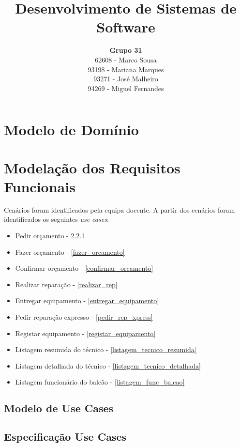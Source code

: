 \documentclass[a4paper, 12pt]{article}
\title {Desenvolvimento de Sistemas de Software}
\author{\textbf{Grupo 31} \\
        62608 - Marco Sousa \\
        93198 - Mariana Marques \\
        93271 - José Malheiro \\
        94269 - Miguel Fernandes}
\begin{document}
\maketitle

\section{Modelo de Domínio}

\section{Modelação dos Requisitos Funcionais}
Cenários foram identificados pela equipa docente.
A partir dos cenários foram identificados os seguintes \textit{use cases}:
\begin{itemize}
        \item Pedir orçamento - \ref{pedir_orcamento}
        \item Fazer orçamento - \ref{fazer_orcamento}
        \item Confirmar orçamento - \ref{confirmar_orcamento}
        \item Realizar reparação - \ref{realizar_rep}
        \item Entregar equipamento - \ref{entregar_equipamento}
        \item Pedir reparação expresso - \ref{pedir_rep_xpress}
        \item Registar equipamento - \ref{registar_equipamento}
        \item Listagem resumida do técnico - \ref{listagem_tecnico_resumida}
        \item Listagem detalhada do técnico - \ref{listagem_tecnico_detalhada}
        \item Listagem funcionário do balcão - \ref{listagem_func_balcao}
\end{itemize}
\subsection{Modelo de Use Cases}

\subsection{Especificação Use Cases}

\subsubsection{} \label{pedir_orcamento}

\end{document}
